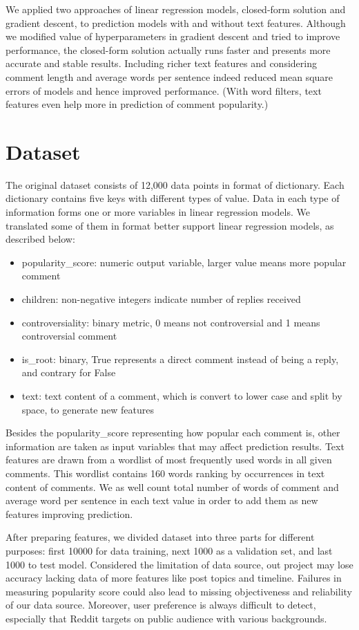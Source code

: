\documentclass[letterpaper, 12pt]{article}
\begin{document}
We applied two approaches of linear regression models, closed-form solution and gradient descent, to prediction models with and without text features. Although we modified value of hyperparameters in gradient descent and tried to improve performance, the closed-form solution actually runs faster and presents more accurate and stable results. Including richer text features and considering comment length and average words per sentence indeed reduced mean square errors of models and hence improved performance. (With word filters, text features even help more in prediction of comment popularity.)


\section*{Dataset}
The original dataset consists of 12,000 data points in format of dictionary. Each dictionary contains five keys with different types of value. Data in each type of information forms one or more variables in linear regression models. We translated some of them in format better support linear regression models, as described below:

\begin{itemize}
    \item popularity\_score: numeric output variable, larger value means more popular comment
    \item children: non-negative integers indicate number of replies received
    \item controversiality: binary metric, 0 means not controversial and 1 means controversial comment
    \item is\_root: binary, True represents a direct comment instead of being a reply, and contrary for False
    \item text: text content of a comment, which is convert to lower case and split by space, to generate new features
\end{itemize}

Besides the popularity\_score representing how popular each comment is, other information are taken as input variables that may affect prediction results. Text features are drawn from a wordlist of most frequently used words in all given comments. This wordlist contains 160 words ranking by occurrences in text content of comments. We as well count total number of words of comment and average word per sentence in each text value in order to add them as new features improving prediction.

After preparing features, we divided dataset into three parts for different purposes: first 10000 for data training, next 1000 as a validation set, and last 1000 to test model. Considered the limitation of data source, out project may lose accuracy lacking data of more features like post topics and timeline. Failures in measuring popularity score could also lead to missing objectiveness and reliability of our data source. Moreover, user preference is always difficult to detect, especially that Reddit targets on public audience with various backgrounds.
\end{document}
